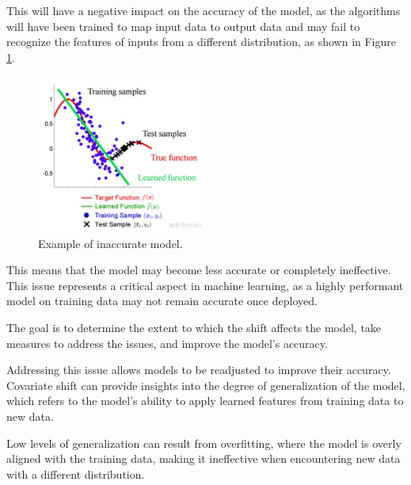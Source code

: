 	
This will have a negative impact on the accuracy of the model, as the algorithms will have been trained to map input data to output data and may fail to recognize the features of inputs from a different distribution, as shown in Figure \ref{fig:inaccurate-model}.  
	

	\begin{figure}[H]
		\centering
		\includegraphics[width=0.5\textwidth]{assets/covariate_shift.png} 
		\caption{Example of inaccurate model.}
		\label{fig:inaccurate-model}
	\end{figure}  

\vspace{0.5cm}

This means that the model may become less accurate or completely ineffective. This issue represents a critical aspect in machine learning, as a highly performant model on training data may not remain accurate once deployed.

The goal is to determine the extent to which the shift affects the model, take measures to address the issues, and improve the model's accuracy.
	
Addressing this issue allows models to be readjusted to improve their accuracy. Covariate shift can provide insights into the degree of generalization of the model, which refers to the model's ability to apply learned features from training data to new data.

Low levels of generalization can result from overfitting, where the model is overly aligned with the training data, making it ineffective when encountering new data with a different distribution.  
